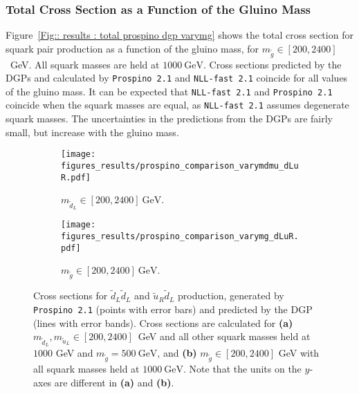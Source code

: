 \documentclass[twoside,english]{uiofysmaster}
\begin{document}
{{\subsubsection{Total Cross Section as a Function of the Gluino Mass}

Figure~\ref{Fig:: results : total prospino dgp varymg} shows the total cross section for squark pair production as a function of the gluino mass, for $m_{\widetilde{g}} \in [200, 2400]$~GeV. All squark masses are held at $1000~\mathrm{GeV}$. Cross sections predicted by the DGPs and calculated by \verb|Prospino 2.1| and \verb|NLL-fast 2.1| coincide for all values of the gluino mass. It can be expected that \verb|NLL-fast 2.1| and \verb|Prospino 2.1| coincide when the squark masses are equal, as \verb|NLL-fast 2.1| assumes degenerate squark masses. The uncertainties in the predictions from the DGPs are fairly small, but increase with the gluino mass. 




\begin{figure}
    \centering
    \begin{subfigure}[b]{0.9\textwidth}
        \texttt{[image: figures\_results/prospino\_comparison\_varymdmu\_dLuR.pdf]}
\caption{$m_{\widetilde{d}_L} \in[200, 2400]~\mathrm{GeV}$.}
\label{Fig:: results : dLuL uLuL prospino dgp}
    \end{subfigure}

    \begin{subfigure}[b]{0.9\textwidth}
    \centering
        \texttt{[image: figures\_results/prospino\_comparison\_varymg\_dLuR.pdf]}
\caption{$m_{\widetilde{g}}\in[200, 2400]~\mathrm{GeV}$.}
\label{Fig:: results : dLuL uLuL prospino dgp varymg}
    \end{subfigure}

    \caption{Cross sections for $\widetilde{d}_L \widetilde{d}_L$ and $\widetilde{u}_R \widetilde{d}_L$ production, generated by {\tt Prospino 2.1} (points with error bars) and predicted by the DGP (lines with error bands). Cross sections are calculated for \textbf{(a)} $m_{\widetilde{d}_L}, m_{\widetilde{u}_L} \in [200, 2400]$~GeV and all other squark masses held at $1000$ GeV and $m_{\tilde{g}}=500~\mathrm{GeV}$, and \textbf{(b)} $m_{\tilde{g}} \in [200, 2400]$ GeV with all squark masses held at $ 1000~\mathrm{GeV}$. Note that the units on the $y$-axes are different in \textbf{(a)} and \textbf{(b)}.}\label{Fig:: results : dLuR dLdL cross sections}
\end{figure}


}}
\end{document}
